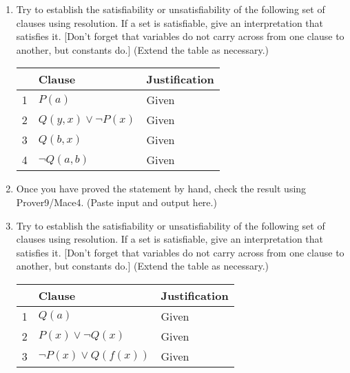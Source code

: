 \documentclass{cs81-homework}
\begin{document}
\begin{enumerate}
  \begin{solution}
  \end{solution}
  
\item {} Try to establish the satisfiability or unsatisfiability of the
  following set of clauses using resolution.  If a set is satisfiable, give an
  interpretation that satisfies it.  [Don't forget that variables do not carry
  across from one clause to another, but constants do.]  (Extend the table as
  necessary.)

  \begin{solution}
    \begin{center}
      \begin{tabular}{|l||l|l|}
        \hline
        & Clause & Justification \\
        \hline\hline
        1 & \(P(a)\) & Given \\
        2 & \(Q(y, x) \lor \lnot P(x)\) & Given \\
        3 & \(Q(b, x)\) & Given \\
        4 & \(\lnot Q(a, b)\) & Given \\
      \end{tabular}
    \end{center}
  \end{solution}
  
\item[]  Once you have proved the statement by hand, check the result
  using Prover9/Mace4.  (Paste input and output here.)

  \begin{solution}
  \end{solution}
  
\item {} Try to establish the satisfiability or unsatisfiability of the
  following set of clauses using resolution.  If a set is satisfiable, give an
  interpretation that satisfies it.  [Don't forget that variables do not carry
  across from one clause to another, but constants do.]  (Extend the table as
  necessary.)

  \begin{solution}
    \begin{center}
      \begin{tabular}{|l||l|l|}
        \hline
        & Clause & Justification \\
        \hline\hline
        1 & \(Q(a)\) & Given \\
        2 & \(P(x) \lor \lnot Q(x)\) & Given \\
        3 & \(\lnot P(x) \lor Q(f(x))\) & Given \\
      \end{tabular}
    \end{center}
  \end{solution}
  

\end{enumerate}
\end{document}
